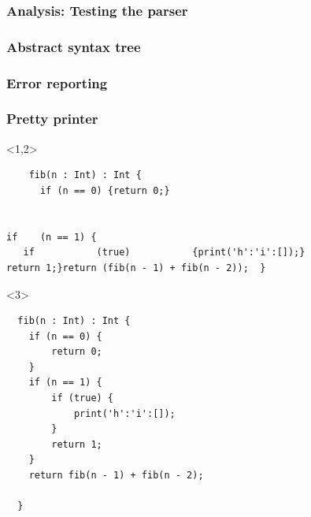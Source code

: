 \documentclass{beamer}
\begin{document}
\begin{frame}
  \frametitle{Analysis: Testing the parser}

\end{frame}


\begin{frame}
  \frametitle{Abstract syntax tree}

\end{frame}


\begin{frame}
  \frametitle{Error reporting}
\end{frame}

\begin{frame}[fragile]
  \frametitle{Pretty printer}

  \begin{onlyenv}<1,2>
  \begin{verbatim}
    fib(n : Int) : Int {
      if (n == 0) {return 0;}


if    (n == 1) {
   if           (true)           {print('h':'i':[]);}
return 1;}return (fib(n - 1) + fib(n - 2));  }
    \end{verbatim}
  \end{onlyenv}

\begin{onlyenv}<3>
  \begin{verbatim}
  fib(n : Int) : Int {
    if (n == 0) {
        return 0;
    }
    if (n == 1) {
        if (true) {
            print('h':'i':[]);
        }
        return 1;
    }
    return fib(n - 1) + fib(n - 2);

  }
    \end{verbatim}
  \end{onlyenv}
\end{frame}
\end{document}
